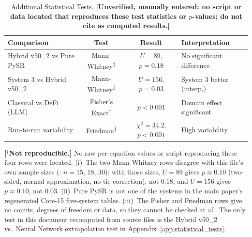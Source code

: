 \documentclass[twoside,11pt]{article}
\begin{document}
\begin{table}[H]
\centering
\caption{Additional Statistical Tests.
  \textbf{[Unverified, manually entered: no script or data located that reproduces
  these test statistics or $p$-values; do not cite as computed results.]}}
\label{tab:additional_stats}
{\small\begin{tabular}{@{}lccl@{}}
\toprule
\textbf{Comparison} & \textbf{Test} & \textbf{Result} & \textbf{Interpretation} \\
\midrule
Hybrid v50\_2 vs Pure PySR & Mann-Whitney\textsuperscript{$\dagger$} & $U = 89$, $p = 0.18$ & No significant difference \\
System 3 vs Hybrid v50\_2 & Mann-Whitney\textsuperscript{$\dagger$} & $U = 156$, $p = 0.03$ & System 3 better (interp.) \\
Classical vs DeFi (LLM) & Fisher's Exact\textsuperscript{$\dagger$} & $p < 0.001$ & Domain effect significant \\
Run-to-run variability & Friedman\textsuperscript{$\dagger$} & $\chi^2 = 34.2$, $p < 0.001$ & High variability \\
\bottomrule
\end{tabular}}

\smallskip
{\footnotesize\textbf{[$^\dagger$Not reproducible.]} No raw per-equation values or script
reproducing these four rows were located. (i)~The two Mann-Whitney rows disagree with this
file's own sample sizes (: $n=15$, $18$, $30$): with those
sizes, $U=89$ gives $p\approx0.10$ (two-sided, normal approximation, no tie correction),
not $0.18$, and $U=156$ gives $p\approx0.10$, not $0.03$. (ii)~Pure PySR is not one of the
systems in the main paper's regenerated Core-15 five-system tables. (iii)~The Fisher and
Friedman rows give no counts, degrees of freedom or data, so they cannot be checked at all.
The only test in this document recomputed from source files is the Hybrid v50\_2 vs.\ Neural
Network extrapolation test in Appendix~\ref{app:statistical_tests}.}
\end{table}
\end{document}
